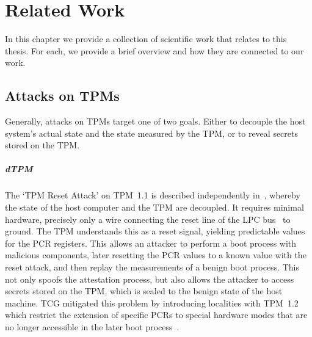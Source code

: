 
\chapter{Related Work}\label{chapter:related_work}

In this chapter we provide a collection of scientific work that relates to this thesis.
For each, we provide a brief overview and how they are connected to our work.

\section{Attacks on TPMs}

Generally, attacks on \acp{TPM} target one of two goals.
Either to decouple the host system's actual state and the state measured by the \ac{TPM}, or to reveal secrets stored on the TPM\@.




\paragraph{\Acl{dTPM}}

The `TPM Reset Attack' on TPM~1.1 is described independently in~\cite{kauerBernhard,sparks2007}, whereby the state of the host computer and the TPM are decoupled.
It requires minimal hardware, precisely only a wire connecting the reset line of the LPC bus~\cite{lpc} to ground.
The TPM understands this as a reset signal, yielding predictable values for the \ac{PCR} registers.
This allows an attacker to perform a boot process with malicious components, later resetting the \ac{PCR} values to a known value with the reset attack, and then replay the measurements of a benign boot process.
This not only spoofs the attestation process, but also allows the attacker to access secrets stored on the TPM, which is sealed to the benign state of the host machine.
\Ac{TCG} mitigated this problem by introducing localities with TPM~1.2 which restrict the extension of specific \acp{PCR} to special hardware modes that are no longer accessible in the later boot process~\cite{Proskurin2016}.

